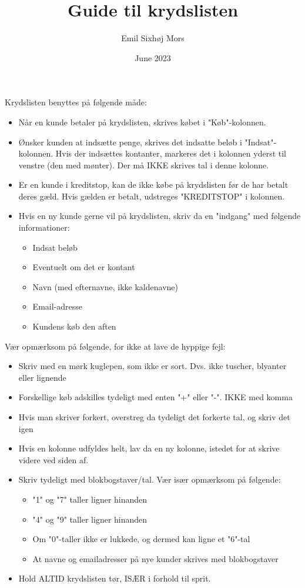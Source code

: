 \documentclass{article}
\title{Guide til krydslisten}
\author{Emil Sixhøj Mors}
\date{June 2023}
\begin{document}
\maketitle
Krydslisten benyttes på følgende måde:

\begin{itemize}
    \item Når en kunde betaler på krydslisten, skrives købet i "Køb"-kolonnen.
    \item Ønsker kunden at indsætte penge, skrives det indsatte beløb i "Indsat"-kolonnen. Hvis der indsættes kontanter, markeres det i kolonnen yderst til venstre (den med mønter). Der må IKKE skrives tal i denne kolonne.
    \item Er en kunde i kreditstop, kan de ikke købe på krydslisten før de har betalt deres gæld. Hvis gælden er betalt, udstreges "KREDITSTOP" i kolonnen.
    \item Hvis en ny kunde gerne vil på krydslisten, skriv da en "indgang" med følgende informationer:
    \begin{itemize}
        \item Indsat beløb
        \item Eventuelt om det er kontant
        \item Navn (med efternavne, ikke kaldenavne)
        \item Email-adresse
        \item Kundens køb den aften
    \end{itemize}
\end{itemize}

Vær opmærksom på følgende, for ikke at lave de hyppige fejl:
\begin{itemize}
    \item Skriv med en mørk kuglepen, som ikke er sort. Dvs. ikke tuscher, blyanter eller lignende
    \item Forskellige køb adskilles tydeligt med enten "+" eller "-". IKKE med komma
    \item Hvis man skriver forkert, overstreg da tydeligt det forkerte tal, og skriv det igen
    \item Hvis en kolonne udfyldes helt, lav da en ny kolonne, istedet for at skrive videre ved siden af.
    \item Skriv tydeligt med blokbogstaver/tal. Vær især opmærksom på følgende:
    \begin{itemize}
        \item "1" og "7" taller ligner hinanden
        \item "4" og "9" taller ligner hinanden
        \item Om "0"-taller ikke er lukkede, og dermed kan ligne et "6"-tal
        \item At navne og emailadresser på nye kunder skrives med blokbogstaver
    \end{itemize}
    \item Hold ALTID krydslisten tør, ISÆR i forhold til sprit.
\end{itemize}
\end{document}
